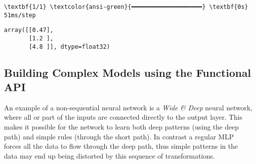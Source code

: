 \documentclass[12pt letter]{report}
\makeatletter
\newcommand{\boxspacing}{\kern\kvtcb@left@rule\kern\kvtcb@boxsep}
\newcommand{\prompt}[4]{
        {\ttfamily\llap{{\color{#2}[#3]:\hspace{3pt}#4}}\vspace{-\baselineskip}}
    }
\makeatother
\begin{document}
    \begin{Verbatim}[commandchars=\\\{\}]
\textbf{1/1} \textcolor{ansi-green}{━━━━━━━━━━━━━━━━━━━━} \textbf{0s} 51ms/step
    \end{Verbatim}

            \begin{tcolorbox}[breakable, size=fbox, boxrule=.5pt, pad at break*=1mm, opacityfill=0]
\prompt{Out}{outcolor}{ }{\boxspacing}
\begin{Verbatim}[commandchars=\\\{\}]
array([[0.47],
       [1.2 ],
       [4.8 ]], dtype=float32)
\end{Verbatim}
\end{tcolorbox}
        
\subsection{Building Complex Models using the Functional
API}\label{building-complex-models-using-the-functional-api}

An example of a non-sequential neural network is a \emph{Wide \& Deep}
neural network, where all or part of the inputs are connected directly
to the output layer. This makes it possible for the network to learn
both deep patterns (using the deep path) and simple rules (through the
short path). In contrast a regular MLP forces all the data to flow
through the deep path, thus simple patterns in the data may end up being
distorted by this sequence of transformations.
\end{document}
